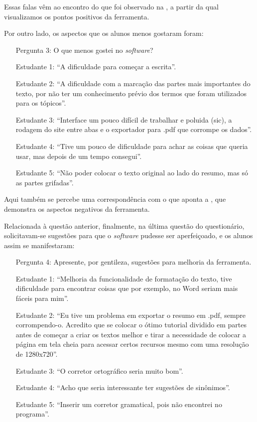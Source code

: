 \documentclass[portuguese]{textolivre}
\begin{document}
Essas falas vêm ao encontro do que foi observado na , a partir da qual visualizamos os pontos positivos da ferramenta.

Por outro lado, os aspectos que os alunos menos gostaram foram:

\begin{itemize}
    \item[Pergunta 3:] O que menos gostei no \textit{software}?
    \item[Estudante 1:] “A dificuldade para começar a escrita”.
    \item[Estudante 2:] “A dificuldade com a marcação das partes mais importantes do texto, por não ter um conhecimento prévio dos termos que foram utilizados para os tópicos”.
    \item[Estudante 3:] “Interface um pouco difícil de trabalhar e poluida (sic), a rodagem do site entre abas e o exportador para .pdf que corrompe os dados”.
    \item[Estudante 4:] “Tive um pouco de dificuldade para achar as coisas que queria usar, mas depois de um tempo consegui”.
    \item[Estudante 5:] “Não poder colocar o texto original ao lado do resumo, mas só as partes grifadas”.
\end{itemize}

Aqui também se percebe uma correspondência com o que aponta a , que demonstra os aspectos negativos da ferramenta.

Relacionada à questão anterior, finalmente, na última questão do questionário, solicitavam-se sugestões para que o \textit{software} pudesse ser aperfeiçoado, e os alunos assim se manifestaram:

\begin{itemize}
    \item[Pergunta 4:] Apresente, por gentileza, sugestões para melhoria da ferramenta.
    \item[Estudante 1:] “Melhoria da funcionalidade de formatação do texto, tive dificuldade para encontrar coisas que por exemplo, no Word seriam mais fáceis para mim”.
    \item[Estudante 2:] “Eu tive um problema em exportar o resumo em .pdf, sempre corrompendo-o. Acredito que se colocar o ótimo tutorial dividido em partes antes de começar a criar os textos melhor e tirar a necessidade de colocar a página em tela cheia para acessar certos recursos mesmo com uma resolução de 1280x720”.
    \item[Estudante 3:] “O corretor ortográfico seria muito bom”.
    \item[Estudante 4:] “Acho que seria interessante ter sugestões de sinônimos”.
    \item[Estudante 5:] “Inserir um corretor gramatical, pois não encontrei no programa”.
\end{itemize}
\end{document}
